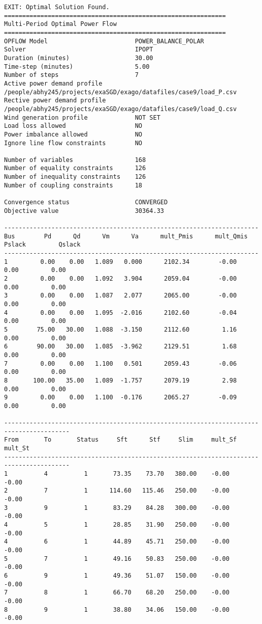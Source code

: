 \begin{lstlisting}
EXIT: Optimal Solution Found.
=============================================================
Multi-Period Optimal Power Flow
=============================================================
OPFLOW Model                        POWER_BALANCE_POLAR
Solver                              IPOPT
Duration (minutes)                  30.00
Time-step (minutes)                 5.00 
Number of steps                     7
Active power demand profile         /people/abhy245/projects/exaSGD/exago/datafiles/case9/load_P.csv
Rective power demand profile        /people/abhy245/projects/exaSGD/exago/datafiles/case9/load_Q.csv
Wind generation profile             NOT SET
Load loss allowed                   NO
Power imbalance allowed             NO
Ignore line flow constraints        NO

Number of variables                 168
Number of equality constraints      126
Number of inequality constraints    126
Number of coupling constraints      18

Convergence status                  CONVERGED
Objective value                     30364.33

----------------------------------------------------------------------
Bus        Pd      Qd      Vm      Va      mult_Pmis      mult_Qmis      Pslack         Qslack        
----------------------------------------------------------------------
1         0.00    0.00   1.089   0.000      2102.34        -0.00         0.00         0.00
2         0.00    0.00   1.092   3.904      2059.04        -0.00         0.00         0.00
3         0.00    0.00   1.087   2.077      2065.00        -0.00         0.00         0.00
4         0.00    0.00   1.095  -2.016      2102.60        -0.04         0.00         0.00
5        75.00   30.00   1.088  -3.150      2112.60         1.16         0.00         0.00
6        90.00   30.00   1.085  -3.962      2129.51         1.68         0.00         0.00
7         0.00    0.00   1.100   0.501      2059.43        -0.06         0.00         0.00
8       100.00   35.00   1.089  -1.757      2079.19         2.98         0.00         0.00
9         0.00    0.00   1.100  -0.176      2065.27        -0.09         0.00         0.00

----------------------------------------------------------------------------------------
From       To       Status     Sft      Stf     Slim     mult_Sf  mult_St 
----------------------------------------------------------------------------------------
1          4          1       73.35    73.70   380.00    -0.00    -0.00
2          7          1      114.60   115.46   250.00    -0.00    -0.00
3          9          1       83.29    84.28   300.00    -0.00    -0.00
4          5          1       28.85    31.90   250.00    -0.00    -0.00
4          6          1       44.89    45.71   250.00    -0.00    -0.00
5          7          1       49.16    50.83   250.00    -0.00    -0.00
6          9          1       49.36    51.07   150.00    -0.00    -0.00
7          8          1       66.70    68.20   250.00    -0.00    -0.00
8          9          1       38.80    34.06   150.00    -0.00    -0.00


\end{lstlisting}
